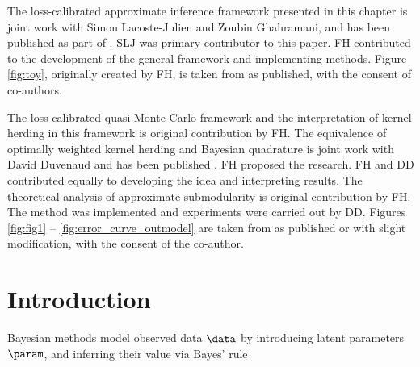 \begin{summarycontributions}
The loss-calibrated approximate inference framework presented in this chapter is joint work with Simon Lacoste-Julien and Zoubin Ghahramani, and has been published as part of \citep{Lacoste2011}. SLJ was primary contributor to this paper. FH contributed to the development of the general framework and implementing methods. Figure \ref{fig:toy}, originally created by FH, is taken from \citep{Lacoste2011} as published, with the consent of co-authors.

The loss-calibrated quasi-Monte Carlo framework and the interpretation of kernel herding in this framework is original contribution by FH. The equivalence of optimally weighted kernel herding and Bayesian quadrature is joint work with David Duvenaud and has been published \citep{Huszar2012herding}. FH proposed the research. FH and DD contributed equally to developing the idea and interpreting results. The theoretical analysis of approximate submodularity is original contribution by FH. The method was implemented and experiments were carried out by DD. Figures \ref{fig:fig1} -- \ref{fig:error_curve_outmodel} are taken from \citep{Huszar2012herding} as published or with slight modification, with the consent of the co-author.
\end{summarycontributions}


\section{Introduction}

Bayesian methods model observed data $\data$ by introducing latent parameters $\param$, and inferring their value via Bayes' rule

